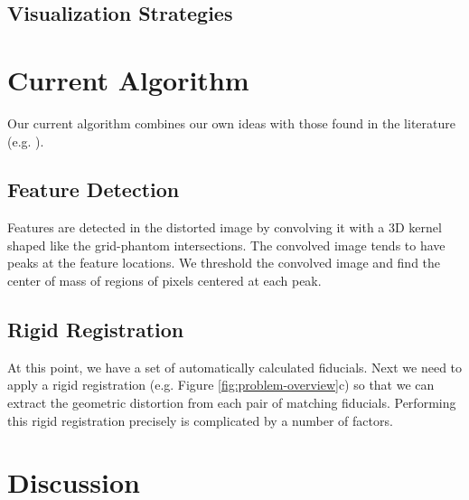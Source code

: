 \documentclass[12pt]{article}
\begin{document}
\subsection{Visualization Strategies}

\section{Current Algorithm}

Our current algorithm combines our own ideas with those found in the literature (e.g. \cite{stanescu2010,baldwin2007}).  

\subsection{Feature Detection}

Features are detected in the distorted image by convolving it with a 3D kernel shaped like the grid-phantom intersections.  The convolved image tends to have peaks at the feature locations.  We threshold the convolved image and find the center of mass of regions of pixels centered at each peak.

\subsection{Rigid Registration}

At this point, we have a set of automatically calculated fiducials.  Next we need to apply a rigid registration (e.g. Figure \ref{fig:problem-overview}c) so that we can extract the geometric distortion from each pair of matching fiducials.  Performing this rigid registration precisely is complicated by a number of factors.

\section{Discussion}



\end{document}
